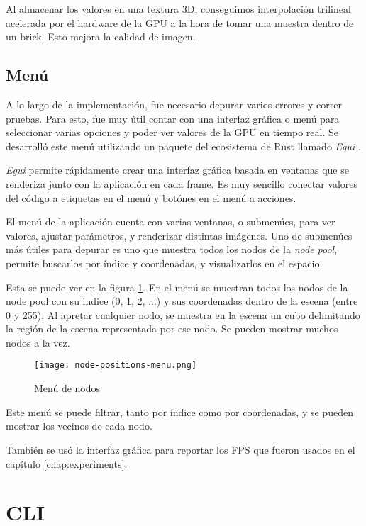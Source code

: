 Al almacenar los valores en una textura 3D, conseguimos interpolación trilineal acelerada por el hardware de la GPU a la hora de tomar una muestra dentro de un brick.
Esto mejora la calidad de imagen.

\subsection{Menú}

A lo largo de la implementación, fue necesario depurar varios errores y correr pruebas.
Para esto, fue muy útil contar con una interfaz gráfica o menú para seleccionar varias opciones y poder ver valores de la GPU en tiempo real.
Se desarrolló este menú utilizando un paquete del ecosistema de Rust llamado \textit{Egui} \cite{egui}.

\textit{Egui} permite rápidamente crear una interfaz gráfica basada en ventanas que se renderiza junto con la aplicación en cada frame.
Es muy sencillo conectar valores del código a etiquetas en el menú y botónes en el menú a acciones.

El menú de la aplicación cuenta con varias ventanas, o submenúes, para ver valores, ajustar parámetros, y renderizar distintas imágenes.
Uno de submenúes más útiles para depurar es uno que muestra todos los nodos de la \textit{node pool}, permite buscarlos por índice y coordenadas, y visualizarlos en el espacio.

Esta se puede ver en la figura \ref{fig:node-positions-menu}.
En el menú se muestran todos los nodos de la node pool con su indice (0, 1, 2, ...) y sus coordenadas dentro de la escena (entre 0 y 255).
Al apretar cualquier nodo, se muestra en la escena un cubo delimitando la región de la escena representada por ese nodo.
Se pueden mostrar muchos nodos a la vez.

\begin{figure}
    \centering
    \texttt{[image: node-positions-menu.png]}
    \caption{Menú de nodos}
    \label{fig:node-positions-menu}
\end{figure}

Este menú se puede filtrar, tanto por índice como por coordenadas, y se pueden mostrar los vecinos de cada nodo.

También se usó la interfaz gráfica para reportar los FPS que fueron usados en el capítulo \ref{chap:experiments}.

\section{CLI}


